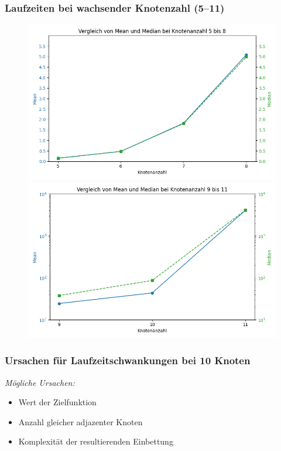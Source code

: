 \documentclass[9pt]{beamer}
\begin{document}
    \begin{frame}
    \frametitle{Laufzeiten bei wachsender Knotenzahl (5–11)}
    \begin{figure}
        \centering
        \begin{minipage}{0.48\textwidth}
            \centering
            \includegraphics[width=\linewidth]{figures/Mean_Medain5-8.png}
        \end{minipage}\hfill
        \begin{minipage}{0.48\textwidth}
            \centering
            \includegraphics[width=\linewidth]{figures/Mean_Medain9-11.png}
        \end{minipage}
    \end{figure}
    \end{frame}

    \begin{frame}
    \frametitle{Ursachen für Laufzeitschwankungen bei 10 Knoten}
    \textit{Mögliche Ursachen:}
    \begin{itemize}
        \item Wert der Zielfunktion
        \item Anzahl gleicher adjazenter Knoten
        \item Komplexität der resultierenden Einbettung
    \end{itemize}
    \end{frame}
\end{document}
